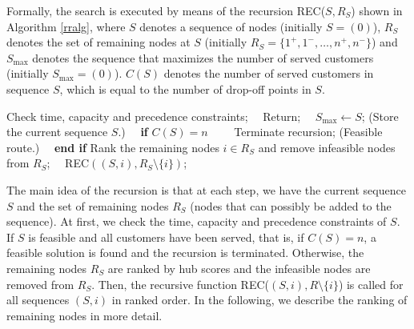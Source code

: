 \documentclass[dissertation,draft*]{aaltoseries}
\begin{document}
Formally, the search is executed by means of the recursion 
REC($S,R_S$) shown in Algorithm \ref{rralg}, where $S$ denotes a sequence of nodes (initially $S=(0)$), $R_S$ denotes %
the set of remaining nodes at $S$ (initially $R_S=\{1^{+},1^{-}, \ldots, n^{+},n^{-}\}$) and $S_{\max}$ denotes the sequence that maximizes the number 
of served customers (initially $S_{\max} = (0)$). $C(S)$ denotes the number of served customers in sequence $S$, which is equal to the 
number of drop-off points in $S$.
\begin{algorithm}
{\footnotesize
\begin{algorithmic}
\STATE Check time, capacity and precedence constraints;
\STATE \ \ Return;
\ENDIF
 \STATE \ \ $S_{\max} \leftarrow S$;   \hfill (Store the current sequence $S$.) %
 \STATE \ \ \textbf{if} $C(S) = n$
 \STATE \ \ \ \ Terminate recursion; \hfill (Feasible route.)
 \STATE \ \ \textbf{end if}
 \ENDIF
\STATE Rank the remaining nodes $i \in R_S$ and remove infeasible nodes from $R_S$; 
\STATE \ \ REC$((S,i) , R_S \setminus \{i\})$; %
\ENDFOR
\end{algorithmic}
\caption{\footnotesize A recursive solution REC($S,R_S$) to the single-vehicle DARP. $S$ denotes a sequence of 
nodes (initially $S=(0)$), $R_S$ denotes %
the set of remaining nodes (initially $R_S=\{1^{+},1^{-}, \ldots, n^{+},n^{-}\}$) and $S_{\max}$ denotes the sequence that maximizes the number 
of served customers (initially $S_{\max} = (0)$). $C(S)$ denotes the number of served customers in sequence $S$, which is equal to the 
number of drop-off points in $S$.}
\label{rralg}
}
\end{algorithm}

The main idea of the recursion is that at each step, we have the current sequence $S$ 
and the set of remaining nodes $R_S$ (nodes that can possibly be added to the sequence). 
At first, we check the time, capacity and precedence constraints of $S$.
If $S$ is feasible and all customers have been served, that is, if $C(S) = n$, a feasible solution is found and 
the recursion is terminated.
Otherwise,
the remaining nodes $R_S$ are ranked by hub scores and the infeasible nodes 
are removed from $R_S$.
Then, the recursive function REC($(S,i),R \setminus \{i\}$) is called
for all sequences $(S,i)$ in ranked order.
In the following, we describe the ranking of remaining nodes in more detail.
\end{document}
